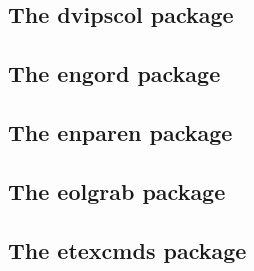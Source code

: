 \documentclass[a4paper,12pt]{article}
\makeatletter
\providecommand*{\eTeX}{$\csname m@th\endcsname\varepsilon$-\TeX}
\newcommand*{\xpackage}[1]{\textsf{#1}}
\newcommand*{\xfile}[1]{\texttt{#1}}
\newcommand*{\cs}[1]{\texttt{\textbackslash#1}}
\newcommand*{\tocinclude}[1]{%
  \setcounter{tocdepth}{3}%
  \begingroup
    \makeatletter
    \def\@prj{#1}%
    \let\contentsline\foreign@contentsline
  \endgroup
}
\def\foreign@contentsline#1#2#3#4{%
  \ifx\\#4\\%
    \csname l@#1\endcsname{#2}{#3}%
  \else
    \ifHy@linktocpage
      \csname l@#1\endcsname{{#2}}{%
        \hyper@linkfile{#3}{\@prj.pdf}{#4}%
      }%
    \else
      \csname l@#1\endcsname{%
        \hyper@linkfile{#2}{\@prj.pdf}{#4}%
      }{#3}%
    \fi
  \fi
}%
\newcommand*{\pkgsectformat}[1]{%
  \texorpdfstring{%
    \textcolor{link}{The} %
    \xpackage{#1} %
    \textcolor{link}{package}%
  }{#1}%
}
\makeatother
\begin{document}
\newpage
\subsection{\pkgsectformat{dvipscol}}
\label{dvipscol}
\begin{abstract}
Color support for dvips in \xfile{dvips.def} involves the
color stack of dvips. The package tries to remove unnecessary
uses of the stack to avoid the error ``out of coor stack space''.
\end{abstract}
\tocinclude{dvipscol}


\newpage
\subsection{\pkgsectformat{engord}}
\label{engord}
\begin{abstract}
The package generates the suffix of English ordinal numbers.
It can be used with plain and \LaTeX\ formats.
\end{abstract}
\tocinclude{engord}

\newpage
\subsection{\pkgsectformat{enparen}}
\label{enparen}
\begin{abstract}
The package defines macros to set parentheses that automatically
change the symbols from inner to outer fences.
\end{abstract}
\tocinclude{enparen}

\newpage
\subsection{\pkgsectformat{eolgrab}}
\label{eolgrab}
\begin{abstract}
This package implements a generic argument grabber
to catch an argument that is delimited by the line end.
\end{abstract}
\tocinclude{eolgrab}

\newpage
\subsection{\pkgsectformat{etexcmds}}
\label{etexcmds}
\begin{abstract}
New primitive commands are introduced in \eTeX. Sometimes the
names collide with existing macros. This package solves this
name clashes by adding a prefix to \eTeX's commands. For example,
\eTeX's \cs{unexpanded} is provided as \cs{etex@unexpanded}.
\end{abstract}
\tocinclude{etexcmds}
\end{document}

